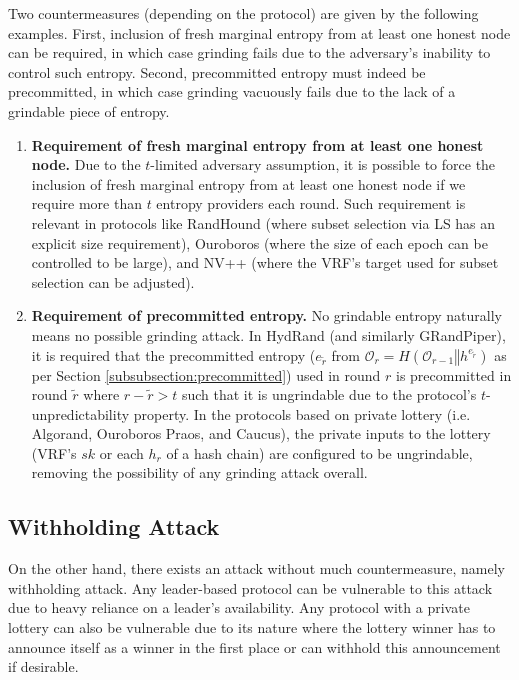 \documentclass[letterpaper,twocolumn,10pt]{article}
\theoremstyle{definition}
\theoremstyle{remark}
\begin{document}
Two countermeasures (depending on the protocol) are given by the following examples. First, inclusion of fresh marginal entropy from at least one honest node can be required, in which case grinding fails due to the adversary's inability to control such entropy. Second, precommitted entropy must indeed be precommitted, in which case grinding vacuously fails due to the lack of a grindable piece of entropy.
\begin{enumerate}
\item \textbf{Requirement of fresh marginal entropy from at least one honest node.} Due to the $t$-limited adversary assumption, it is possible to force the inclusion of fresh marginal entropy from at least one honest node if we require more than $t$ entropy providers each round. Such requirement is relevant in protocols like RandHound (where subset selection via LS has an explicit size requirement), Ouroboros (where the size of each epoch can be controlled to be large), and NV++ (where the VRF's target used for subset selection can be adjusted).
\item \textbf{Requirement of precommitted entropy.} No grindable entropy naturally means no possible grinding attack. In HydRand (and similarly GRandPiper), it is required that the precommitted entropy ($e_{\tilde{r}}$ from $\mathcal{O}_r = H(\mathcal{O}_{r - 1} \mathbin\Vert h^{e_{\tilde{r}}})$ as per Section \ref{subsubsection:precommitted}) used in round $r$ is precommitted in round $\tilde{r}$ where $r - \tilde{r} > t$ such that it is ungrindable due to the protocol's $t$-unpredictability property. In the protocols based on private lottery (i.e. Algorand, Ouroboros Praos, and Caucus), the private inputs to the lottery (VRF's $sk$ or each $h_r$ of a hash chain) are configured to be ungrindable, removing the possibility of any grinding attack overall.
\end{enumerate}

\subsection{Withholding Attack}
On the other hand, there exists an attack without much countermeasure, namely withholding attack. Any leader-based protocol can be vulnerable to this attack due to heavy reliance on a leader's availability. Any protocol with a private lottery can also be vulnerable due to its nature where the lottery winner has to announce itself as a winner in the first place or can withhold this announcement if desirable.\\
\end{document}
